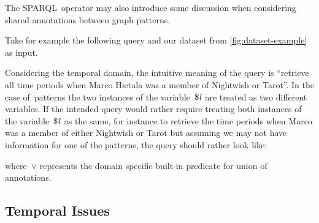 The SPARQL~\UNION operator may also introduce some discussion when considering shared annotations between graph
patterns. 
%
\begin{example}
  Take for example the following query and our dataset from \cref{fig:dataset-example} as input.
  
  Considering the temporal domain, the intuitive meaning of the query is ``retrieve all time periods when
  Marco Hietala was a member of Nightwish or Tarot''.  
  In the case of~\UNION patterns the two instances of the variable~$\$\mathit{l}$ are treated as two different variables.  If
  the intended query would rather require treating both instances of the variable~$\$\mathit{l}$ as the same, for instance to
  retrieve the time periods when Marco was a member of either Nightwish or Tarot but assuming we may not have
  information for one of the patterns, the query should rather look like:
  
  where~$\lor$ represents the domain specific built-in predicate for union of annotations.
\end{example}



\subsection{Temporal Issues}
\label{sec:doma-spec-issu}

